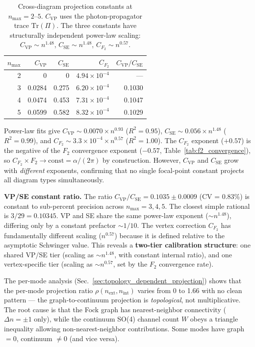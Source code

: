 \documentclass[11pt]{article}
\begin{document}
\begin{table}[h]
\centering
\begin{tabular}{rrrrr}
\hline
$n_{\max}$ & $C_{\mathrm{VP}}$ & $C_{\mathrm{SE}}$ & $C_{F_2}$ & $C_{\mathrm{VP}}/C_{\mathrm{SE}}$ \\
\hline
2 & 0 & 0 & $4.94 \times 10^{-4}$ & --- \\
3 & 0.0284 & 0.275 & $6.20 \times 10^{-4}$ & 0.1030 \\
4 & 0.0474 & 0.453 & $7.31 \times 10^{-4}$ & 0.1047 \\
5 & 0.0599 & 0.582 & $8.32 \times 10^{-4}$ & 0.1029 \\
\hline
\end{tabular}
\caption{Cross-diagram projection constants at $n_{\max} = 2$--$5$.
$C_{\mathrm{VP}}$ uses the photon-propagator trace $\mathrm{Tr}(\Pi)$.
The three constants have structurally independent power-law
scaling: $C_{\mathrm{VP}} \sim n^{1.48}$, $C_{\mathrm{SE}} \sim
n^{1.48}$, $C_{F_2} \sim n^{0.57}$.}
\label{tab:three_diagram}
\end{table}

\noindent Power-law fits give $C_{\mathrm{VP}} \sim 0.0070 \times
n^{0.93}$ ($R^2 = 0.95$), $C_{\mathrm{SE}} \sim 0.056 \times n^{1.48}$
($R^2 = 0.99$), and $C_{F_2} \sim 3.3 \times 10^{-4} \times n^{0.57}$
($R^2 = 1.00$).  The $C_{F_2}$ exponent ($+0.57$) is the negative of
the $F_2$ convergence exponent ($-0.57$,
Table~\ref{tab:f2_convergence}), so
$C_{F_2} \times F_2 \to \mathrm{const} = \alpha/(2\pi)$ by
construction.  However, $C_{\mathrm{VP}}$ and $C_{\mathrm{SE}}$ grow
with \emph{different} exponents, confirming that no single focal-point
constant projects all diagram types simultaneously.

\textbf{VP/SE constant ratio.}
The ratio $C_{\mathrm{VP}}/C_{\mathrm{SE}} = 0.1035 \pm 0.0009$
(CV = 0.83\%) is constant to sub-percent precision across
$n_{\max} = 3, 4, 5$.  The closest simple rational is $3/29 = 0.10345$.
VP and SE share the same power-law exponent (${\sim}n^{1.48}$),
differing only by a constant prefactor ${\sim}1/10$.  The vertex
correction $C_{F_2}$ has fundamentally different scaling ($n^{0.57}$)
because it is defined relative to the asymptotic Schwinger value.
This reveals a \textbf{two-tier calibration structure}: one shared
VP/SE tier (scaling as ${\sim}n^{1.48}$, with constant internal ratio),
and one vertex-specific tier (scaling as ${\sim}n^{0.57}$, set by the
$F_2$ convergence rate).

The per-mode analysis (Sec.~\ref{sec:topology_dependent_projection})
shows that the per-mode projection ratio
$\rho(n_{\mathrm{ext}}, n_{\mathrm{int}})$ varies from 0 to 1.66
with no clean pattern --- the graph-to-continuum projection is
\emph{topological}, not multiplicative.  The root cause is that
the Fock graph has nearest-neighbor connectivity ($\Delta n = \pm 1$
only), while the continuum SO(4) channel count $W$ obeys a triangle
inequality allowing non-nearest-neighbor contributions.  Some modes
have graph $= 0$, continuum $\ne 0$ (and vice versa).
\end{document}
